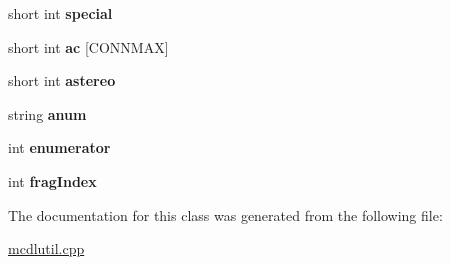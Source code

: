 \begin{DoxyCompactItemize}
\item 
\hypertarget{class_open_babel_1_1_t_single_atom_ab93516b332945267874aab58ff964268}{short int {\bfseries special}}\label{class_open_babel_1_1_t_single_atom_ab93516b332945267874aab58ff964268}

\item 
\hypertarget{class_open_babel_1_1_t_single_atom_a1471df082fbcd6ac5f5aae68a0f714c4}{short int {\bfseries ac} \mbox{[}C\-O\-N\-N\-M\-A\-X\mbox{]}}\label{class_open_babel_1_1_t_single_atom_a1471df082fbcd6ac5f5aae68a0f714c4}

\item 
\hypertarget{class_open_babel_1_1_t_single_atom_a55d7f8ff1151c3886ed69caf9380f446}{short int {\bfseries astereo}}\label{class_open_babel_1_1_t_single_atom_a55d7f8ff1151c3886ed69caf9380f446}

\item 
\hypertarget{class_open_babel_1_1_t_single_atom_a60af38dc46c9ab429f0f13b8b90e58bf}{string {\bfseries anum}}\label{class_open_babel_1_1_t_single_atom_a60af38dc46c9ab429f0f13b8b90e58bf}

\item 
\hypertarget{class_open_babel_1_1_t_single_atom_afd0fd909b4f41a2216f8938023c8ae75}{int {\bfseries enumerator}}\label{class_open_babel_1_1_t_single_atom_afd0fd909b4f41a2216f8938023c8ae75}

\item 
\hypertarget{class_open_babel_1_1_t_single_atom_a3320603b84914bad1a58dfd31de2002b}{int {\bfseries frag\-Index}}\label{class_open_babel_1_1_t_single_atom_a3320603b84914bad1a58dfd31de2002b}

\end{DoxyCompactItemize}


The documentation for this class was generated from the following file\-:\begin{DoxyCompactItemize}
\item 
\hyperlink{mcdlutil_8cpp}{mcdlutil.\-cpp}\end{DoxyCompactItemize}
